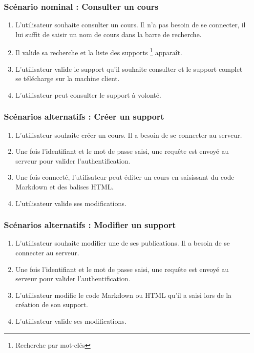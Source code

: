 {\subsubsection{Scénario nominal : Consulter un cours}
    \begin{enumerate}
    
        \item L'utilisateur souhaite consulter un cours. Il n'a pas besoin de se connecter, il lui suffit de saisir un nom de cours dans la barre de recherche.
        \item Il valide sa recherche et la liste des supports \footnote{Recherche par mot-clés} apparaît.
        \item L'utilisateur valide le support qu'il souhaite consulter et le support complet se télécharge sur la machine client.
        \item L'utilisateur peut consulter le support à volonté.
        
    \end{enumerate}


\subsubsection{Scénarios alternatifs : Créer un support}
    
    \begin{enumerate}

        \item L'utilisateur souhaite créer un cours. Il a besoin de se connecter au serveur.
        \item Une fois l'identifiant et le mot de passe saisi, une requête est envoyé au serveur pour valider l'authentification.
        \item Une fois connecté, l'utilisateur peut éditer un cours en saisissant du code Markdown et des balises HTML.
        \item L'utilisateur valide ses modifications.
        
    \end{enumerate}
        
\subsubsection{Scénarios alternatifs : Modifier  un support}

    \begin{enumerate}
        
        \item L'utilisateur souhaite modifier une de ses publications. Il a besoin de se connecter au serveur.
        \item Une fois l'identifiant et le mot de passe saisi, une requête est envoyé au serveur pour valider l'authentification.
        \item L'utilisateur modifie le code Markdown ou HTML qu'il a saisi lors de la création de son support.
        \item L'utilisateur valide ses modifications.
\end{enumerate}

}
